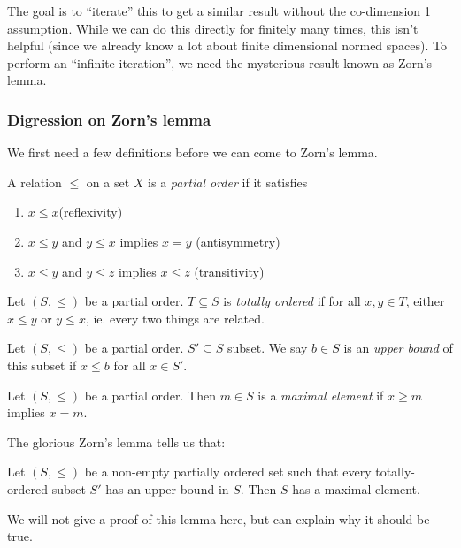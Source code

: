 \documentclass[a4paper]{article}
\begin{document}
The goal is to ``iterate'' this to get a similar result without the co-dimension 1 assumption. While we can do this directly for finitely many times, this isn't helpful (since we already know a lot about finite dimensional normed spaces). To perform an ``infinite iteration'', we need the mysterious result known as Zorn's lemma.
\subsubsection*{Digression on Zorn's lemma}
We first need a few definitions before we can come to Zorn's lemma.
\begin{defi}
  A relation $\leq$ on a set $X$ is a \emph{partial order} if it satisfies
  \begin{enumerate}
    \item $x \leq x$\hfill (reflexivity)
    \item $x \leq y$ and $y \leq x$ implies $x = y$ \hfill (antisymmetry)
    \item $x \leq y$ and $y \leq z$ implies $x \leq z$ \hfill (transitivity)
  \end{enumerate}
\end{defi}

\begin{defi}
  Let $(S, \leq)$ be a partial order. $T\subseteq S$ is \emph{totally ordered} if for all $x, y\in T$, either $x \leq y$ or $y\leq x$, ie. every two things are related.
\end{defi}

\begin{defi}
  Let $(S, \leq)$ be a partial order. $S'\subseteq S$ subset. We say $b\in S$ is an \emph{upper bound} of this subset if $x \leq b$ for all $x \in S'$.
\end{defi}

\begin{defi}
  Let $(S, \leq)$ be a partial order. Then $m\in S$ is a \emph{maximal element} if $x \geq m$ implies $x = m$.
\end{defi}

The glorious Zorn's lemma tells us that:
\begin{lemma}
  Let $(S, \leq)$ be a non-empty partially ordered set such that every totally-ordered subset $S'$ has an upper bound in $S$. Then $S$ has a maximal element.
\end{lemma}
We will not give a proof of this lemma here, but can explain why it should be true.
\end{document}
